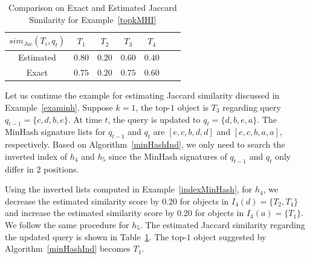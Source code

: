 
\begin{table}[t]
\centering
\caption{Comparison on Exact and Estimated Jaccard Similarity for Example~\ref{topkMHI}}
\setlength{\tabcolsep}{2\tabcolsep}
{
     \begin{tabular}{|c||c|c|c|c|c|c|} \hline 
      $sim_{Jac}(T_i, q_t)$&$T_1$&$T_2$&$T_3$&$T_4$\\ \hline 
      Estimated&$0.80$&$0.20$&$0.60$&$0.40$\\ \hline
      Exact&$0.75$&$0.20$&$0.75$&$0.60$\\ \hline
    \end{tabular} }
\setlength{\tabcolsep}{0.5\tabcolsep}
\label{topkMHIcomp}
\end{table}

\begin{example}  \label{topkMHI} 
Let us continue the example for estimating Jaccard similarity discussed in Example~\ref{examinh}. Suppose $k=1$, the top-$1$ object is $T_3$ regarding query $q_{t-1}=\{c, d, b, e\}$. At time $t$, the query is updated to $q_t=\{d, b, e, a\}$. The MinHash signature lists for $q_{t-1}$ and $q_t$ are $[e, c, b, d, d]$ and $[e, c, b, a, a]$, respectively. Based on Algorithm~\ref{minHashInd}, we only need to search the inverted index of $h_4$ and $h_5$ since the MinHash signatures of $q_{t-1}$ and $q_t$ only differ in $2$ positions.       
   
Using the inverted lists computed in Example~\ref{indexMinHash}, for $h_4$, we decrease the estimated similarity score by $0.20$ for objects in $I_4(d) = \{T_2, T_4\}$ and increase the estimated similarity score by $0.20$ for objects in $I_4(a) = \{T_1\}$. We follow the same procedure for $h_5$. The estimated Jaccard similarity regarding the updated query is shown in Table~\ref{topkMHIcomp}. The top-$1$ object suggested by Algorithm~\ref{minHashInd} becomes $T_1$.   
      
\end{example}





